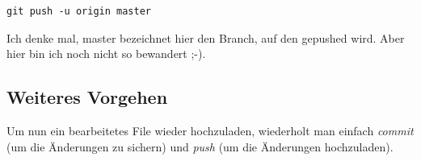 \documentclass[twoside, 11pr]{article}
\begin{document}
\begin{lstlisting}
git push -u origin master
\end{lstlisting}

Ich denke mal, master bezeichnet hier den Branch, auf den gepushed wird. Aber hier bin ich noch nicht so bewandert ;-).

\subsection{Weiteres Vorgehen}

Um nun ein bearbeitetes File wieder hochzuladen, wiederholt man einfach \textit{commit} (um die Änderungen zu sichern) und \textit{push} (um die Änderungen hochzuladen).




%


\end{document}
